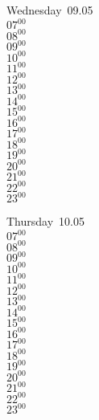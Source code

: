 \documentclass[11pt, a4paper]{book}\usepackage[]{graphicx}\usepackage[]{color}
\begin{document}
\begin{weekdaybox}
  Wednesday~09.05\\
  { 
  \vfill
  $07^{00}$\\
$08^{00}$\\
$09^{00}$\\
$10^{00}$\\
$11^{00}$\\
$12^{00}$\\
$13^{00}$\\
$14^{00}$\\
$15^{00}$\\
$16^{00}$\\
$17^{00}$\\
$18^{00}$\\
$19^{00}$\\
$20^{00}$\\
$21^{00}$\\
$22^{00}$\\
$23^{00}$\\
  }
\end{weekdaybox}
\clearpage
\begin{headerbox}
\end{headerbox}
\begin{weekdaybox}
  Thursday~10.05\\
  { 
  \vfill
  $07^{00}$\\
$08^{00}$\\
$09^{00}$\\
$10^{00}$\\
$11^{00}$\\
$12^{00}$\\
$13^{00}$\\
$14^{00}$\\
$15^{00}$\\
$16^{00}$\\
$17^{00}$\\
$18^{00}$\\
$19^{00}$\\
$20^{00}$\\
$21^{00}$\\
$22^{00}$\\
$23^{00}$\\
  }
\end{weekdaybox} 
\end{document}
